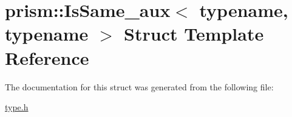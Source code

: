 \hypertarget{structprism_1_1_is_same__aux}{}\section{prism\+:\+:Is\+Same\+\_\+aux$<$ typename, typename $>$ Struct Template Reference}
\label{structprism_1_1_is_same__aux}


The documentation for this struct was generated from the following file\+:\begin{DoxyCompactItemize}
\item 
\hyperlink{type_8h}{type.\+h}\end{DoxyCompactItemize}
